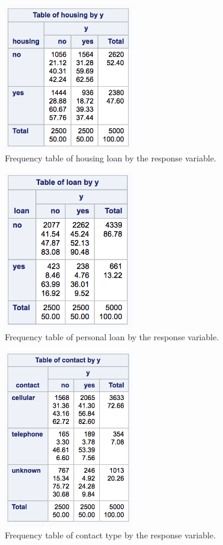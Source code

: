 \documentclass[]{article}
\begin{document}
\begin{figure}
  \centering
    \includegraphics[width=0.5\textwidth]{images/fig9_housing.png}
  \caption{Frequency table of housing loan by the response variable.}
  \label{fig9}
\end{figure}

\begin{figure}
  \centering
    \includegraphics[width=0.5\textwidth]{images/fig10_loan.png}
  \caption{Frequency table of personal loan by the response variable.}
  \label{fig10}
\end{figure}

\begin{figure}
  \centering
    \includegraphics[width=0.5\textwidth]{images/fig11_contact.png}
  \caption{Frequency table of contact type by the response variable.}
  \label{fig11}
\end{figure}
\end{document}
